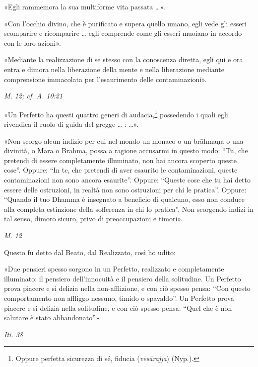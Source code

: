 «Egli rammemora la sua multiforme vita passata …».


«Con l’occhio divino, che è purificato e supera quello umano, egli vede
gli esseri scomparire e ricomparire … egli comprende come gli esseri
muoiano in accordo con le loro azioni».


«Mediante la realizzazione di se stesso con la conoscenza diretta, egli
qui e ora entra e dimora nella liberazione della mente e nella
liberazione mediante comprensione immacolata per l’esaurimento delle
contaminazioni».


\emph{M. 12; cf. A. 10:21}


«Un Perfetto ha questi quattro generi di audacia,\footnote{Oppure perfetta sicurezza di sé, fiducia (\emph{vesārajja}) (Nyp.).}
possedendo i quali egli rivendica il ruolo di guida del gregge … : …​».


«Non scorgo alcun indizio per cui nel mondo un monaco o un brāhmaṇa o
una divinità, o Māra o Brahmā, possa a ragione accusarmi in questo modo:
“Tu, che pretendi di essere completamente illuminato, non hai ancora
scoperto queste cose”. Oppure: “In te, che pretendi di aver esaurito le
contaminazioni, queste contaminazioni non sono ancora esaurite”. Oppure:
“Queste cose che tu hai detto essere delle ostruzioni, in realtà non
sono ostruzioni per chi le pratica”. Oppure: “Quando il tuo Dhamma è
insegnato a beneficio di qualcuno, esso non conduce alla completa
estinzione della sofferenza in chi lo pratica”. Non scorgendo indizi in
tal senso, dimoro sicuro, privo di preoccupazioni e timori».


\emph{M. 12}


Questo fu detto dal Beato, dal Realizzato, così ho udito:


«Due pensieri spesso sorgono in un Perfetto, realizzato e completamente
illuminato: il pensiero dell’innocuità e il pensiero della solitudine.
Un Perfetto prova piacere e si delizia nella non-afflizione, e con ciò
spesso pensa: “Con questo comportamento non affliggo nessuno, timido o
spavaldo”. Un Perfetto prova piacere e si delizia nella solitudine, e
con ciò spesso pensa: “Quel che è non salutare è stato abbandonato”».


\emph{Iti. 38}


